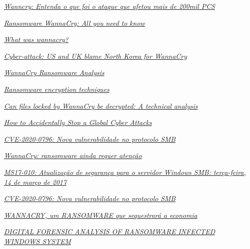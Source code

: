 \documentclass[12pt]{article}
\begin{document}
\href{https://olhardigital.com.br/especial/wannacry/}{\textit{Wanncry: Entenda o que foi o ataque que afetou mais de 200mil PCS}}

\bigskip
\noindent
[Kaspersky]\href{https://www.kaspersky.com/resource-center/threats/ransomware-wannacry}{\textit{Ransomware WannaCry: All you need to know}}

\bigskip
\noindent
[Malwareytes]\href{https://www.malwarebytes.com/wannacry}{\textit{What was wannacry?}}

\bigskip
\noindent
[BBC]\href{https://www.bbc.com/news/world-us-canada-42407488}{\textit{Cyber-attack: US and UK blame North Korea for WannaCry}}

\bigskip
\noindent
[SecureWorks]\href{https://www.secureworks.com/research/wcry-ransomware-analysis}{\textit{WannaCry Ransomware Analysis}}

\bigskip
\noindent
[Medium]\href{https://medium.com/@tarcisioma/ransomware-encryption-techniques-696531d07bb9}{\textit{Ransomware encryption techniques}}

\bigskip
\noindent
[Medium]\href{https://medium.com/threat-intel/wannacry-ransomware-decryption-821c7e3f0a2b}{\textit{Can files locked by WannaCry be decrypted: A technical analysis}}

\bigskip
\noindent
[Malwaretech]\href{https://www.malwaretech.com/2017/05/how-to-accidentally-stop-a-global-cyber-attacks.html}{\textit{How to Accidentally Stop a Global Cyber Attacks}}

\bigskip
\noindent
[Kaspersky]\href{https://www.kaspersky.com.br/blog/smb-311-vulnerability/14532/}{\textit{CVE-2020-0796: Nova vulnerabilidade no protocolo SMB}}

\bigskip
{}\href{https://www.convergenciadigital.com.br/Opiniao/WannaCry%3A-ransomware-ainda-requer-atencao-45352.html?UserActiveTemplate=mobile%2Csite}{\textit{WannaCry: ransomware ainda requer atenção}}

\bigskip
\noindent
[Microsoft]\href{https://support.microsoft.com/pt-br/topic/ms17-010-atualiza%C3%A7%C3%A3o-de-seguran%C3%A7a-para-o-servidor-windows-smb-ter%C3%A7a-feira-14-de-mar%C3%A7o-de-2017-435c22fb-5f9b-f0b3-3c4b-b605f4e6a655}{\textit{MS17-010: Atualização de segurança para o servidor Windows SMB: terça-feira, 14 de março de 2017}}

\bigskip
\noindent
[Kaspersky]\href{https://www.kaspersky.com.br/blog/smb-311-vulnerability/14532/}{\textit{CVE-2020-0796: Nova vulnerabilidade no protocolo SMB}}

\bigskip
{}\href{https://periciacomputacional.com/wannacry-um-ransomware-que-sequestrara-a-economia/}{\textit{WANNACRY, um RANSOMWARE que sequestrará a economia}}

\bigskip
{}\href{https://www.jetir.org/papers/JETIR1905197.pdf/}{\textit{DIGITAL FORENSIC ANALYSIS OF RANSOMWARE INFECTED WINDOWS SYSTEM}}
\end{document}
